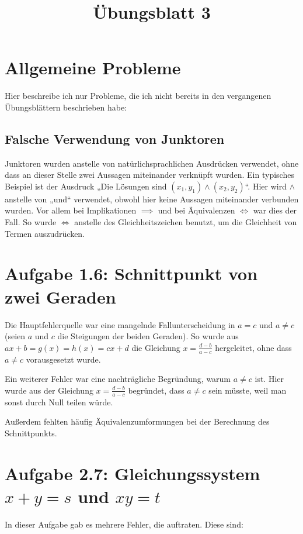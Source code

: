 \documentclass[a4paper]{article}
\title{Übungsblatt 3}
\date{}
\begin{document}
\maketitle

\section{Allgemeine Probleme}

Hier beschreibe ich nur Probleme, die ich nicht bereits in den vergangenen Übungsblättern beschrieben habe:

\subsection{Falsche Verwendung von Junktoren}

Junktoren wurden anstelle von natürlichsprachlichen Ausdrücken verwendet, ohne dass an dieser Stelle zwei Aussagen miteinander verknüpft wurden. Ein typisches Beispiel ist der Ausdruck „Die Lösungen sind $(x_1,y_1) \land (x_2,y_2)$“. Hier wird $\land$ anstelle von „und“ verwendet, obwohl hier keine Aussagen miteinander verbunden wurden. Vor allem bei Implikationen $\implies$ und bei Äquivalenzen $\iff$ war dies der Fall. So wurde $\iff$ anstelle des Gleichheitszeichen benutzt, um die Gleichheit von Termen auszudrücken.

\section{Aufgabe 1.6: Schnittpunkt von zwei Geraden}

Die Hauptfehlerquelle war eine mangelnde Fallunterscheidung in $a=c$ und $a\neq c$ (seien $a$ und $c$ die Steigungen der beiden Geraden). So wurde aus $ax+b=g(x)=h(x)=cx+d$ die Gleichung $x=\frac{d-b}{a-c}$ hergeleitet, ohne dass $a\neq c$ vorausgesetzt wurde.

Ein weiterer Fehler war eine nachträgliche Begründung, warum $a\neq c$ ist. Hier wurde aus der Gleichung $x=\frac{d-b}{a-c}$ begründet, dass $a\neq c$ sein müsste, weil man sonst durch Null teilen würde.

Außerdem fehlten häufig Äquivalenzumformungen bei der Berechnung des Schnittpunkts.

\section{Aufgabe 2.7: Gleichungssystem $x+y=s$ und $xy=t$}

In dieser Aufgabe gab es mehrere Fehler, die auftraten. Diese sind:
\end{document}
